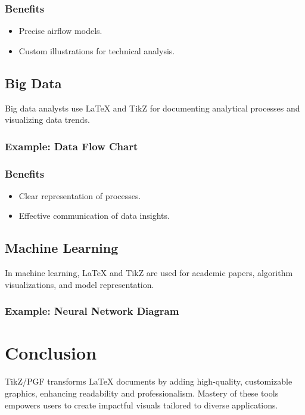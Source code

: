 \documentclass{article}
\begin{document}
\subsubsection*{Benefits}
\begin{itemize}
    \item Precise airflow models.
    \item Custom illustrations for technical analysis.
\end{itemize}

\subsection{Big Data}
Big data analysts use LaTeX and TikZ for documenting analytical processes and visualizing data trends.

\subsubsection*{Example: Data Flow Chart}

\subsubsection*{Benefits}
\begin{itemize}
    \item Clear representation of processes.
    \item Effective communication of data insights.
\end{itemize}

\subsection{Machine Learning}
In machine learning, LaTeX and TikZ are used for academic papers, algorithm visualizations, and model representation.

\subsubsection*{Example: Neural Network Diagram}

\section{Conclusion}
TikZ/PGF transforms LaTeX documents by adding high-quality, customizable graphics, enhancing readability and professionalism. Mastery of these tools empowers users to create impactful visuals tailored to diverse applications.
\end{document}
